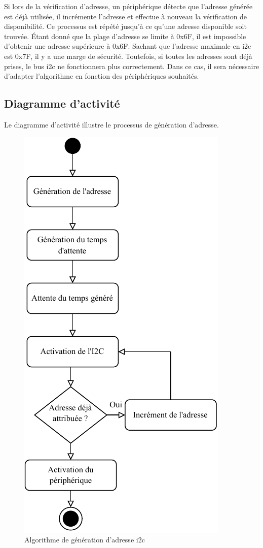 Si lors de la vérification d'adresse, un périphérique détecte que l'adresse générée est déjà utilisée, il incrémente l'adresse et effectue à nouveau la vérification de disponibilité.
Ce processus est répété jusqu'à ce qu'une adresse disponible soit trouvée.
Étant donné que la plage d'adresse se limite à 0x6F, il est impossible d'obtenir une adresse supérieure à 0x6F.
Sachant que l'adresse maximale en \gls{i2c} est 0x7F, il y a une marge de sécurité.
Toutefois, si toutes les adresses sont déjà prises, le bus \gls{i2c} ne fonctionnera plus correctement.
Dans ce cas, il sera nécessaire d'adapter l'algorithme en fonction des périphériques souhaités.

\newpage
\subsection{Diagramme d'activité}

Le diagramme d'activité illustre le processus de génération d'adresse.

\begin{figure}[H]
    \centering
    \includegraphics[scale=1.3]{./assets/figures/gen_addr.pdf}
    \caption{Algorithme de génération d'adresse \gls{i2c}}
\end{figure}

